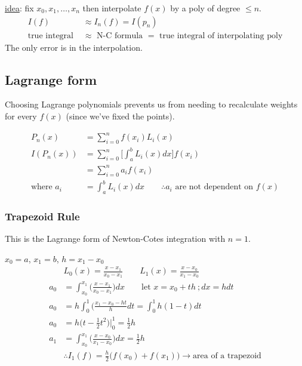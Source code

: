 \documentclass[12pt]{article}
\begin{document}
\underline{idea}: fix $x_0, x_1, \dots, x_n$ then interpolate $f(x)$ by a poly of degree $\leq n$.
%
\begin{align}
I(f) &\approx I_n(f) = I(p_n)\\
\text{true integral } &\approx \text{ N-C formula } = \text{ true integral of interpolating poly}
\end{align}
%
The only error is in the interpolation.

\subsection*{Lagrange form}
Choosing Lagrange polynomials prevents us from needing to recalculate weights for every $f(x)$ (since we've fixed the points).

\begin{align}
P_n(x) &= \sum_{i=0}^{n}f(x_i)L_i(x) \\
%
I(P_n(x)) &= \sum_{i=0}^{n} \bigl[ \int_a^b L_i(x)dx \bigr] f(x_i) \\
%
&= \sum_{i=0}^{n} a_i f(x_i)\\
\text{where } a_i &=  \int_a^b L_i(x)dx \qquad \therefore a_i \text{ are not dependent on } f(x)
\end{align}

\subsubsection{Trapezoid Rule}
This is the Lagrange form of Newton-Cotes integration with $n=1$.

$x_0 = a$, $x_1 = b$, $h = x_1 - x_0$
%
\begin{align}
&L_0(x) = \frac{x-x_1}{x_0-x_1} \qquad L_1(x) = \frac{x-x_0}{x_1-x_0} \\
%
a_0 &= \int_{x_0}^{x_1} \bigl(\frac{x-x_1}{x_0-x_1}\bigr) dx \qquad \text{let } x = x_0 + th \:; dx = hdt \\
%
a_0 &= h \int_0^1 \bigl(\frac{x_1 - x_0 - ht}{h}dt = \int_0^1 h(1-t)dt \\
%
a_0 &= h\bigl(t - \frac{1}{2}t^2 \bigr) |_0^1 = \frac{1}{2}h\\
%
a_1 &= \int_{x_0}^{x_1} \bigl(\frac{x-x_0}{x_1-x_0}\bigr) dx = \frac{1}{2}h\\
%
& \therefore I_1(f) = \frac{h}{2}\bigl(f(x_0) + f(x_1)\bigr) \rightarrow \text{area of a trapezoid}
\end{align}
\end{document}
